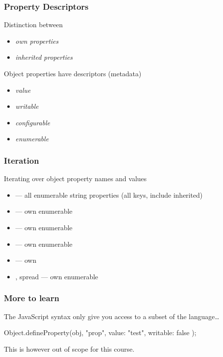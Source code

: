 \begin{frame}[fragile] \frametitle{Property Descriptors}
Distinction between
\begin{itemize}
  \item \emph{own properties}
  \item \emph{inherited properties}
\end{itemize}

Object properties have descriptors (metadata)
\begin{itemize}
  \item \emph{value}
  \item \emph{writable}
  \item \emph{configurable}
  \item \emph{enumerable}
\end{itemize}
\end{frame}

\begin{frame}[fragile] \frametitle{Iteration}
Iterating over object property names and values
\begin{itemize}
  \item {} --- all enumerable string properties (all keys, include inherited)
  \item {} --- own enumerable
  \item {} --- own enumerable
  \item {} --- own enumerable
  \item {} --- own
  \item {}, spread --- own enumerable
\end{itemize}
\end{frame}

\begin{frame}[fragile] \frametitle{More to learn}

The JavaScript syntax only give you access to a subset of the language\ldots
\vspace{8mm}
\begin{CodeBox}{}
Object.defineProperty(obj, "prop", {
    value: "test",
    writable: false
});
\end{CodeBox}
\vspace{8mm}
This is however out of scope for this course.
\end{frame}

